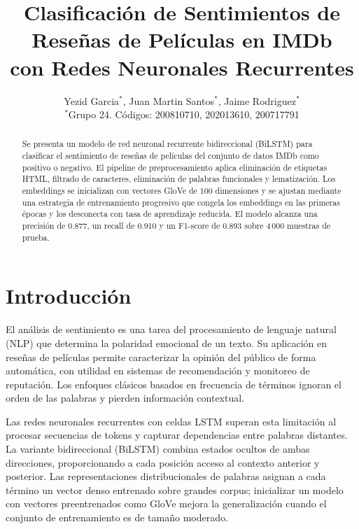 \documentclass[letterpaper, 10pt, conference]{ieeeconf}
\title{\LARGE \bf
Clasificaci\'on de Sentimientos de Rese\~nas de Pel\'iculas en IMDb\\
con Redes Neuronales Recurrentes
}
\author{
  Yezid Garcia$^{*}$, Juan Martin Santos$^{*}$, Jaime Rodriguez$^{*}$ \\
  $^{*}$Grupo 24. C\'odigos: 200810710, 202013610, 200717791
}
\begin{document}
\maketitle
\thispagestyle{empty}
\pagestyle{empty}

\begin{abstract}
Se presenta un modelo de red neuronal recurrente bidireccional (BiLSTM) para
clasificar el sentimiento de rese\~nas de pel\'iculas del conjunto de datos IMDb
como positivo o negativo. El pipeline de preprocesamiento aplica eliminaci\'on
de etiquetas HTML, filtrado de caracteres, eliminaci\'on de palabras funcionales
y lematizaci\'on. Los embeddings se inicializan con vectores GloVe de 100
dimensiones y se ajustan mediante una estrategia de entrenamiento progresivo
que congela los embeddings en las primeras \'epocas y los desconecta con tasa
de aprendizaje reducida. El modelo alcanza una precisi\'on de 0.877, un recall
de 0.910 y un F1-score de 0.893 sobre 4\,000 muestras de prueba.
\end{abstract}

\section{Introducci\'on}

El an\'alisis de sentimiento es una tarea del procesamiento de lenguaje natural
(NLP) que determina la polaridad emocional de un texto. Su aplicaci\'on en
rese\~nas de pel\'iculas permite caracterizar la opini\'on del p\'ublico de
forma autom\'atica, con utilidad en sistemas de recomendaci\'on y monitoreo de
reputaci\'on. Los enfoques cl\'asicos basados en frecuencia de t\'erminos
ignoran el orden de las palabras y pierden informaci\'on contextual.

Las redes neuronales recurrentes con celdas LSTM \cite{hochreiter1997} superan
esta limitaci\'on al procesar secuencias de tokens y capturar dependencias entre
palabras distantes. La variante bidireccional (BiLSTM) combina estados ocultos
de ambas direcciones, proporcionando a cada posici\'on acceso al contexto
anterior y posterior. Las representaciones distribucionales de palabras
\cite{mikolov2013} asignan a cada t\'ermino un vector denso entrenado sobre
grandes corpus; inicializar un modelo con vectores preentrenados como GloVe
\cite{pennington2014} mejora la generalizaci\'on cuando el conjunto de
entrenamiento es de tama\~no moderado.
\end{document}
